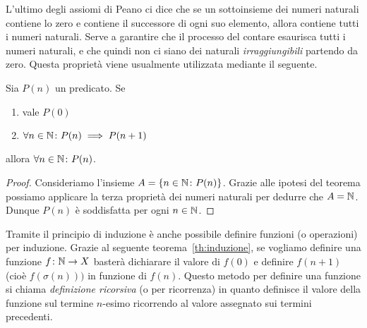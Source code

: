 L'ultimo degli assiomi di Peano 
ci dice che se un sottoinsieme dei numeri naturali contiene lo 
zero e contiene il successore di ogni suo elemento, allora contiene tutti i 
numeri naturali.
Serve a garantire che il processo del contare esaurisca tutti 
i numeri naturali, e che quindi non ci siano dei naturali \emph{irraggiungibili}
partendo da zero.
Questa proprietà viene usualmente utilizzata mediante il seguente.


%
%
\begin{theorem}
  Sia $P(n)$ un predicato.
  Se 
  \begin{enumerate}
    \item vale $P(0)$
    \item $\forall n\in {\mathbb N}\colon P(n)\implies P(n+1)$
  \end{enumerate} 
  allora $\forall n\in {\mathbb N}\colon P(n)$.
\end{theorem}
%
\begin{proof}
  Consideriamo l'insieme $A=\{n\in {\mathbb N}\colon P(n)\}$.
  Grazie alle ipotesi del teorema possiamo applicare la terza
  proprietà dei numeri naturali per dedurre che $A={\mathbb N}$.
  Dunque $P(n)$ è soddisfatta per ogni $n\in{\mathbb N}$.
\end{proof}

Tramite il principio di induzione è anche possibile 
definire funzioni (o operazioni) per induzione.
Grazie al seguente teorema~\ref{th:induzione}, 
se vogliamo definire una funzione $f\colon{\mathbb N}\to X$
basterà dichiarare il valore di $f(0)$ e definire $f(n+1)$ 
(cioè $f(\sigma(n)))$ in funzione di $f(n)$.
Questo metodo per definire una funzione si chiama 
\emph{definizione ricorsiva} (o per ricorrenza) in quanto definisce 
il valore della funzione sul termine $n$-esimo ricorrendo
al valore assegnato sui termini precedenti.

